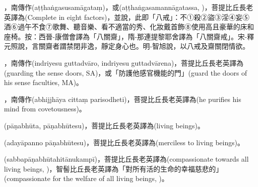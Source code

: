 \startitemgroup[noteitems]
\item{}，南傳作(aṭṭhaṅgasusamāgataṃ)，或(aṭṭhaṅgasamannāgatassa, )，菩提比丘長老英譯為(Complete in eight factors)，並說，此即「八戒」：不①殺②盜③淫④妄⑤酒⑥過午不食⑦歌舞、聽音樂、看不適當的秀、化妝戴首飾⑧使用高且豪華的床和座椅。按：西晉-康僧會譯為「八關齋」，隋-那連提黎耶舍譯為「八關齋戒」。宋-釋元照說，言關齋者謂禁閉非逸，靜定身心也。明-智旭說，以八戒及齋關閉情欲。
\stopitemgroup

\startitemgroup[noteitems]
\item{}，南傳作(indriyesu guttadvāro, indriyesu guttadvārena)，菩提比丘長老英譯為(guarding the sense doors, SA)，或「防護他感官機能的門」(guard the doors of his sense faculties, MA)。
\stopitemgroup

\startitemgroup[noteitems]
\item{}，南傳作(abhijjhāya cittaṃ parisodheti)，菩提比丘長老英譯為(he purifies his mind from covetousness)。
\stopitemgroup

\startitemgroup[noteitems]
\item{}(pāṇabhūta, pāṇabhūtesu)，菩提比丘長老英譯為(living beings)。
\item{}(adayāpanno pāṇabhūtesu)，菩提比丘長老英譯為(merciless to living beings)。
\item{}(sabbapāṇabhūtahitānukampī)，菩提比丘長老英譯為(compassionate towards all living beings, )，智髻比丘長老英譯為「對所有活的生命的幸福慈悲的」(compassionate for the welfare of all living beings, )。
\stopitemgroup

